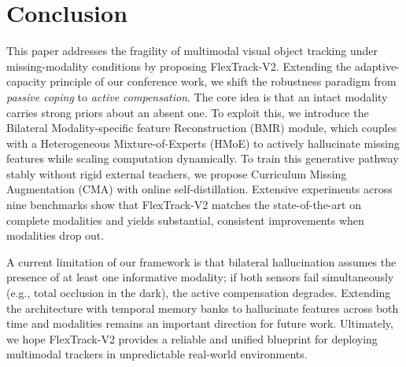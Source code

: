 \section{Conclusion}
\label{sec:conclusion}

This paper addresses the fragility of multimodal visual object tracking under missing-modality conditions by proposing FlexTrack-V2. Extending the adaptive-capacity principle of our conference work, we shift the robustness paradigm from \emph{passive coping} to \emph{active compensation}. The core idea is that an intact modality carries strong priors about an absent one. To exploit this, we introduce the Bilateral Modality-specific feature Reconstruction (BMR) module, which couples with a Heterogeneous Mixture-of-Experts (HMoE) to actively hallucinate missing features while scaling computation dynamically. To train this generative pathway stably without rigid external teachers, we propose Curriculum Missing Augmentation (CMA) with online self-distillation. Extensive experiments across nine benchmarks show that FlexTrack-V2 matches the state-of-the-art on complete modalities and yields substantial, consistent improvements when modalities drop out. 

A current limitation of our framework is that bilateral hallucination assumes the presence of at least one informative modality; if both sensors fail simultaneously (e.g., total occlusion in the dark), the active compensation degrades. Extending the architecture with temporal memory banks to hallucinate features across both time and modalities remains an important direction for future work. Ultimately, we hope FlexTrack-V2 provides a reliable and unified blueprint for deploying multimodal trackers in unpredictable real-world environments.
